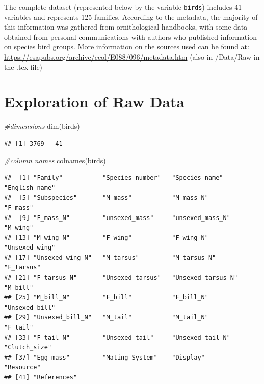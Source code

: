 \documentclass[
  12pt,
]{article}
\newenvironment{Shaded}{\begin{snugshade}}{\end{snugshade}}
\newcommand{\CommentTok}[1]{\textcolor[rgb]{0.56,0.35,0.01}{\textit{#1}}}
\newcommand{\FunctionTok}[1]{\textcolor[rgb]{0.00,0.00,0.00}{#1}}
\newcommand{\NormalTok}[1]{#1}
\begin{document}
The complete dataset (represented below by the variable \texttt{birds})
includes 41 variables and represents 125 families. According to the
metadata, the majority of this information was gathered from
ornithological handbooks, with some data obtained from personal
communications with authors who published information on species bird
groups. More information on the sources used can be found at:
\url{https://esapubs.org/archive/ecol/E088/096/metadata.htm} (also in
/Data/Raw in the .tex file)

\newpage

\hypertarget{exploration-of-raw-data}{%
\section{Exploration of Raw Data}\label{exploration-of-raw-data}}

\begin{Shaded}
\begin{Highlighting}[]
\CommentTok{\#dimensions}
\FunctionTok{dim}\NormalTok{(birds)}
\end{Highlighting}
\end{Shaded}

\begin{verbatim}
## [1] 3769   41
\end{verbatim}

\begin{Shaded}
\begin{Highlighting}[]
\CommentTok{\#column names}
\FunctionTok{colnames}\NormalTok{(birds)}
\end{Highlighting}
\end{Shaded}

\begin{verbatim}
##  [1] "Family"           "Species_number"   "Species_name"     "English_name"    
##  [5] "Subspecies"       "M_mass"           "M_mass_N"         "F_mass"          
##  [9] "F_mass_N"         "unsexed_mass"     "unsexed_mass_N"   "M_wing"          
## [13] "M_wing_N"         "F_wing"           "F_wing_N"         "Unsexed_wing"    
## [17] "Unsexed_wing_N"   "M_tarsus"         "M_tarsus_N"       "F_tarsus"        
## [21] "F_tarsus_N"       "Unsexed_tarsus"   "Unsexed_tarsus_N" "M_bill"          
## [25] "M_bill_N"         "F_bill"           "F_bill_N"         "Unsexed_bill"    
## [29] "Unsexed_bill_N"   "M_tail"           "M_tail_N"         "F_tail"          
## [33] "F_tail_N"         "Unsexed_tail"     "Unsexed_tail_N"   "Clutch_size"     
## [37] "Egg_mass"         "Mating_System"    "Display"          "Resource"        
## [41] "References"
\end{verbatim}
\end{document}
